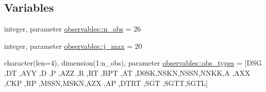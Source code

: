 \subsection*{Variables}
\begin{DoxyCompactItemize}
\item 
integer, parameter \hyperlink{namespaceobservables_af01978bb96f8f41956fee58691edf7fc}{observables\+::n\+\_\+obs} = 26
\item 
integer, parameter \hyperlink{namespaceobservables_a631bf3be23b16de8f578e6820180f71b}{observables\+::j\+\_\+max} = 20
\item 
character(len=4), dimension(1\+:n\+\_\+obs), parameter \hyperlink{namespaceobservables_a90f1315ec196e65b251b3c25e597f972}{observables\+::obs\+\_\+types} = \mbox{[}\textquotesingle{}D\+SG \textquotesingle{},\textquotesingle{}DT \textquotesingle{},\textquotesingle{}A\+YY \textquotesingle{},\textquotesingle{}D \textquotesingle{},\textquotesingle{}P \textquotesingle{},\textquotesingle{}A\+ZZ \textquotesingle{},\textquotesingle{}R \textquotesingle{} ,\textquotesingle{}RT \textquotesingle{},\textquotesingle{}R\+PT \textquotesingle{},\textquotesingle{}AT \textquotesingle{},\textquotesingle{}D0\+SK\textquotesingle{},\textquotesingle{}N\+S\+KN\textquotesingle{},\textquotesingle{}N\+S\+SN\textquotesingle{},\textquotesingle{}N\+N\+KK\textquotesingle{},\textquotesingle{}A \textquotesingle{} ,\textquotesingle{}A\+XX \textquotesingle{},\textquotesingle{}C\+KP \textquotesingle{},\textquotesingle{}RP \textquotesingle{},\textquotesingle{}M\+S\+SN\textquotesingle{},\textquotesingle{}M\+S\+KN\textquotesingle{},\textquotesingle{}A\+ZX \textquotesingle{},\textquotesingle{}AP \textquotesingle{},\textquotesingle{}D\+T\+RT\textquotesingle{} ,\textquotesingle{}S\+GT \textquotesingle{},\textquotesingle{}S\+G\+TT\textquotesingle{},\textquotesingle{}S\+G\+TL\textquotesingle{}\mbox{]}
\end{DoxyCompactItemize}
